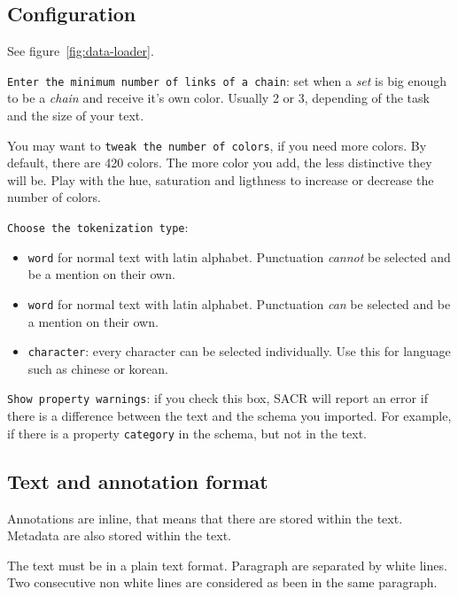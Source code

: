 \documentclass[12pt]{article}
\begin{document}
 \subsection{Configuration}

\label{sec:configuration}

See figure~\ref{fig:data-loader}.

\verb|Enter the minimum number of links of a chain|: set when a \emph{set} is
big enough to be a \emph{chain} and receive it's own color.  Usually 2 or 3,
depending of the task and the size of your text.

You may want to \verb|tweak the number of colors|, if you need more colors.
By default, there are 420 colors.  The more color you add, the less
distinctive they will be.  Play with the hue, saturation and ligthness to
increase or decrease the number of colors.

\verb|Choose the tokenization type|:
\begin{itemize}
   \item \verb|word| for normal text with latin alphabet.  Punctuation
   \emph{cannot} be selected and be a mention on their own.
   \item \verb|word| for normal text with latin alphabet.  Punctuation
   \emph{can} be selected and be a mention on their own.
   \item \verb|character|: every character can be selected individually.  Use
   this for language such as chinese or korean.
\end{itemize}

\verb|Show property warnings|: if you check this box, SACR will report an
error if there is a difference between the text and the schema you imported.
For example, if there is a property \verb|category| in the schema, but not in
the text.

 \subsection{Text and annotation format}

Annotations are inline, that means that there are stored within the text.
Metadata are also stored within the text.

The text must be in a plain text format.  Paragraph are separated by white
lines. Two consecutive non white lines are considered as been in the same
paragraph.
\end{document}
